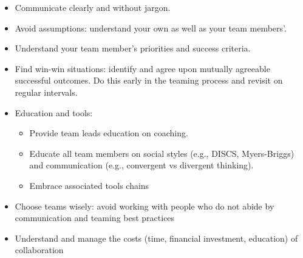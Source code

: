 \begin{itemize}
\begin{itemize}
    \item Communicate clearly and without jargon.
\item  Avoid assumptions: understand your own as well as your team members’. 
\item Understand your team member’s priorities and success criteria.
\item Find win-win situations: identify and agree upon mutually agreeable successful outcomes.  Do this early in the teaming process and revisit on regular intervals.
\item Education and tools: 
\begin{itemize}
    \item Provide team leads education on coaching.  
\item Educate all team members on social styles (e.g., DISCS, Myers-Briggs) and communication (e.g., convergent vs divergent thinking).  
\item Embrace associated tools chains
\end{itemize}
\item Choose teams wisely: avoid working with people who do not abide by communication and teaming best practices
\item Understand and manage the costs (time, financial investment, education) of collaboration

\end{itemize}
\end{itemize}